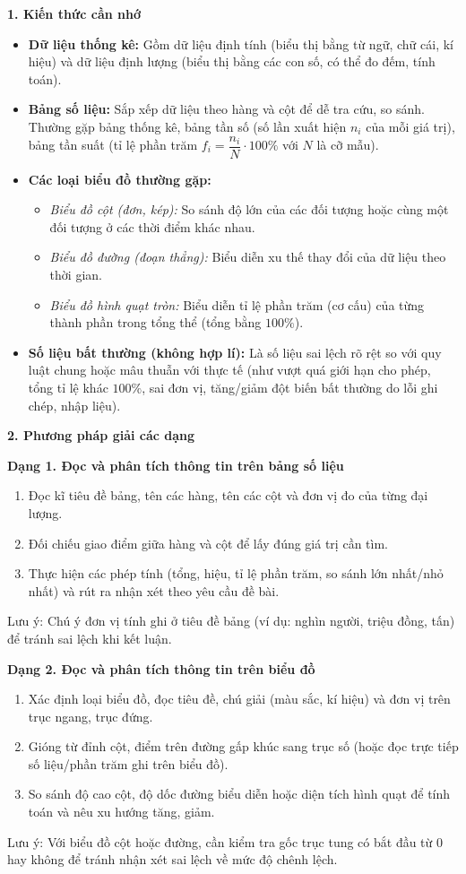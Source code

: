 \textbf{1. Kiến thức cần nhớ}
\begin{itemize}
\item \textbf{Dữ liệu thống kê:} Gồm dữ liệu định tính (biểu thị bằng từ ngữ, chữ cái, kí hiệu) và dữ liệu định lượng (biểu thị bằng các con số, có thể đo đếm, tính toán).
\item \textbf{Bảng số liệu:} Sắp xếp dữ liệu theo hàng và cột để dễ tra cứu, so sánh. Thường gặp bảng thống kê, bảng tần số (số lần xuất hiện $n_i$ của mỗi giá trị), bảng tần suất (tỉ lệ phần trăm $f_i = \dfrac{n_i}{N} \cdot 100\%$ với $N$ là cỡ mẫu).
\item \textbf{Các loại biểu đồ thường gặp:}
\begin{itemize}
\item \textit{Biểu đồ cột (đơn, kép):} So sánh độ lớn của các đối tượng hoặc cùng một đối tượng ở các thời điểm khác nhau.
\item \textit{Biểu đồ đường (đoạn thẳng):} Biểu diễn xu thế thay đổi của dữ liệu theo thời gian.
\item \textit{Biểu đồ hình quạt tròn:} Biểu diễn tỉ lệ phần trăm (cơ cấu) của từng thành phần trong tổng thể (tổng bằng $100\%$).
\end{itemize}
\item \textbf{Số liệu bất thường (không hợp lí):} Là số liệu sai lệch rõ rệt so với quy luật chung hoặc mâu thuẫn với thực tế (như vượt quá giới hạn cho phép, tổng tỉ lệ khác $100\%$, sai đơn vị, tăng/giảm đột biến bất thường do lỗi ghi chép, nhập liệu).
\end{itemize}

\textbf{2. Phương pháp giải các dạng}

\textbf{Dạng 1. Đọc và phân tích thông tin trên bảng số liệu}
\begin{enumerate}
\item Đọc kĩ tiêu đề bảng, tên các hàng, tên các cột và đơn vị đo của từng đại lượng.
\item Đối chiếu giao điểm giữa hàng và cột để lấy đúng giá trị cần tìm.
\item Thực hiện các phép tính (tổng, hiệu, tỉ lệ phần trăm, so sánh lớn nhất/nhỏ nhất) và rút ra nhận xét theo yêu cầu đề bài.
\end{enumerate}
Lưu ý: Chú ý đơn vị tính ghi ở tiêu đề bảng (ví dụ: nghìn người, triệu đồng, tấn) để tránh sai lệch khi kết luận.

\textbf{Dạng 2. Đọc và phân tích thông tin trên biểu đồ}
\begin{enumerate}
\item Xác định loại biểu đồ, đọc tiêu đề, chú giải (màu sắc, kí hiệu) và đơn vị trên trục ngang, trục đứng.
\item Gióng từ đỉnh cột, điểm trên đường gấp khúc sang trục số (hoặc đọc trực tiếp số liệu/phần trăm ghi trên biểu đồ).
\item So sánh độ cao cột, độ dốc đường biểu diễn hoặc diện tích hình quạt để tính toán và nêu xu hướng tăng, giảm.
\end{enumerate}
Lưu ý: Với biểu đồ cột hoặc đường, cần kiểm tra gốc trục tung có bắt đầu từ $0$ hay không để tránh nhận xét sai lệch về mức độ chênh lệch.


